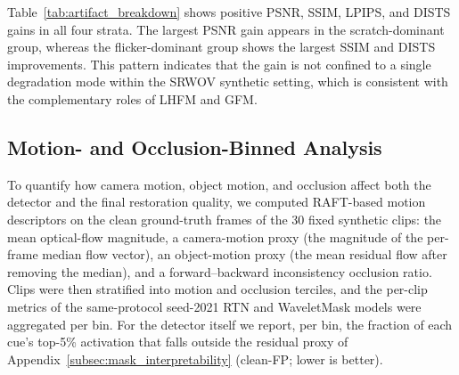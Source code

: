 Table~\ref{tab:artifact_breakdown} shows positive PSNR, SSIM, LPIPS, and DISTS gains in all four strata. The largest PSNR gain appears in the scratch-dominant group, whereas the flicker-dominant group shows the largest SSIM and DISTS improvements. This pattern indicates that the gain is not confined to a single degradation mode within the SRWOV synthetic setting, which is consistent with the complementary roles of LHFM and GFM.

\subsection{Motion- and Occlusion-Binned Analysis}\label{subsec:motion_binning}

To quantify how camera motion, object motion, and occlusion affect both the detector and the final restoration quality, we computed RAFT-based motion descriptors on the clean ground-truth frames of the 30 fixed synthetic clips: the mean optical-flow magnitude, a camera-motion proxy (the magnitude of the per-frame median flow vector), an object-motion proxy (the mean residual flow after removing the median), and a forward--backward inconsistency occlusion ratio. Clips were then stratified into motion and occlusion terciles, and the per-clip metrics of the same-protocol seed-2021 RTN and WaveletMask models were aggregated per bin. For the detector itself we report, per bin, the fraction of each cue's top-5\% activation that falls outside the residual proxy of Appendix~\ref{subsec:mask_interpretability} (clean-FP; lower is better).

